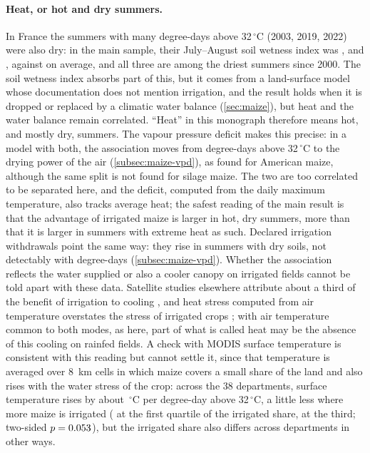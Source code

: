 \paragraph{Heat, or hot and dry summers.} In France the summers with many degree-days above 32\,$^{\circ}$C (2003, 2019, 2022) were also dry: in the main sample, their July--August soil wetness index was \SwiTwoThousandThree, \SwiTwentyNineteen{} and \SwiTwentyTwentyTwo, against \SwiMean{} on average, and all three are among the \SwiRankMax{} driest summers since 2000. The soil wetness index absorbs part of this, but it comes from a land-surface model whose documentation does not mention irrigation, and the result holds when it is dropped or replaced by a climatic water balance (\cref{sec:maize}), but heat and the water balance remain correlated. ``Heat'' in this monograph therefore means hot, and mostly dry, summers. The vapour pressure deficit makes this precise: in a model with both, the association moves from degree-days above 32\,$^{\circ}$C to the drying power of the air (\cref{subsec:maize-vpd}), as \textcite{lobell2013} found for American maize, although the same split is not found for silage maize. The two are too correlated to be separated here, and the deficit, computed from the daily maximum temperature, also tracks average heat; the safest reading of the main result is that the advantage of irrigated maize is larger in hot, dry summers, more than that it is larger in summers with extreme heat as such. Declared irrigation withdrawals point the same way: they rise in summers with dry soils, not detectably with degree-days (\cref{subsec:maize-vpd}). Whether the association reflects the water supplied or also a cooler canopy on irrigated fields cannot be told apart with these data. Satellite studies elsewhere attribute about a third of the benefit of irrigation to cooling \parencite{zhu2022}, and heat stress computed from air temperature overstates the stress of irrigated crops \parencite{siebert2017}; with air temperature common to both modes, as here, part of what is called heat may be the absence of this cooling on rainfed fields. A check with MODIS surface temperature is consistent with this reading but cannot settle it, since that temperature is averaged over 8~km cells in which maize covers a small share of the land and also rises with the water stress of the crop: across the 38 departments, surface temperature rises by about \LstSlope{}\,$^{\circ}$C per degree-day above 32\,$^{\circ}$C, a little less where more maize is irrigated (\LstSlopeQone{} at the first quartile of the irrigated share, \LstSlopeQthree{} at the third; two-sided $p = 0.053$), but the irrigated share also differs across departments in other ways.

